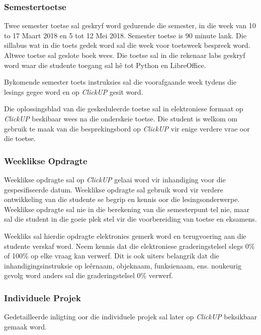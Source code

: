     \subsubsection{Semestertoetse}
        Twee semester toetse sal geskryf word gedurende die semester, in die
        week van 10 to 17 Maart 2018 en 5 tot 12 Mei 2018. Semester
        toetse is 90 minute lank. Die sillabus wat in die toets gedek word sal
        die week voor toetsweek bespreek word. Altwee toetse sal geslote boek
        wees. Die toetse sal in die rekenaar labs geskryf word waar die
        studente toegang sal h\^{e} tot Python en LibreOffice.

        Bykomende semester toets instruksies sal die voorafgaande week tydens
        die lesings gegee word en op \textit{ClickUP} gesit word.

        Die oplossingsblad van die geskeduleerde toetse sal in elektroniese
        formaat op \textit{ClickUP} beskibaar wees na die onderskeie toetse.
        Die student is welkom om gebruik te maak van die besprekingsbord op
        \textit{ClickUP} vir enige verdere vrae oor die toetse.

    \subsubsection{Weeklikse Opdragte} \label{sec:tutoriaal}
        Weeklikse opdragte sal op \textit{ClickUP} gelaai word vir inhandiging
        voor die gespesifiseerde datum. Weeklikse opdragte sal gebruik word vir
        verdere ontwikkeling van die studente se begrip en kennis oor die
        lesingsonderwerpe. Weeklikse opdragte sal nie in die berekening van die
        semesterpunt tel nie, maar sal die student in die goeie plek stel vir
        die voorbereiding van toetse en eksamens.

        Weekliks sal hierdie opdragte elektronies gemerk word en terugvoering
        aan die studente verskaf word. Neem kennis dat die elektroniese
        graderingstelsel slegs 0\% of 100\% op elke vraag kan verwerf. Dit is
        ook uiters belangrik dat die inhandigingsinstruksie op le\^ernaam,
        objeknaam, funksienaam, ens. noukeurig gevolg word anders sal die
        graderingstelsel 0\% verwerf.

    \subsubsection{Individuele Projek}
        Gedetailleerde inligting oor die individuele projek sal later op
        \textit{ClickUP} beksikbaar gemaak word.

